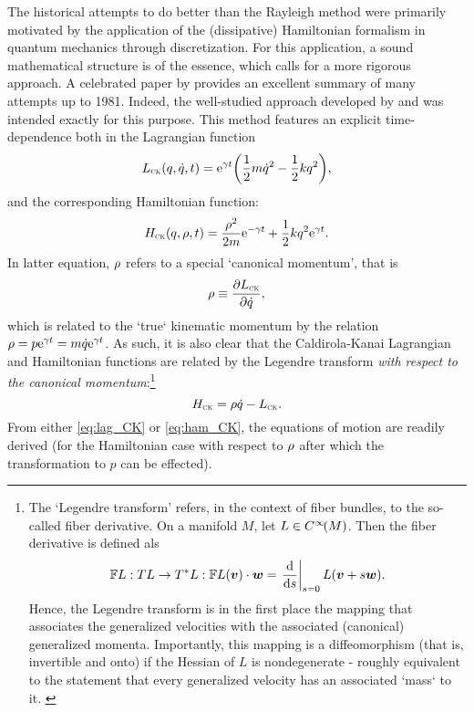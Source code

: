 The historical attempts to do better than the Rayleigh method were primarily motivated by the application of the (dissipative) Hamiltonian formalism in quantum mechanics through discretization. For this application, a sound mathematical structure is of the essence, which calls for a more rigorous approach. A celebrated paper by
\citet{Dekker1981} provides an excellent summary of many attempts up to 1981. Indeed, the well-studied approach developed by \citet{Caldirola1941} and \citet{Kanai1948} was intended exactly for this purpose. This method features an explicit time-dependence both in the Lagrangian function
\begin{equation}
    L_\text{\tiny{\textsc{CK}}}(q, \dot{q}, t) = \mathrm{e}^{\gamma t}\qty(\frac{1}{2}m\dot{q}^2 - \frac{1}{2}kq^2),
    \label{eq:lag_CK}
\end{equation}
and the corresponding Hamiltonian function:
\begin{equation}
    H_\text{\tiny{\textsc{CK}}}(q, \rho, t) = \frac{\rho^2}{2m}\mathrm{e}^{-\gamma t} + \frac{1}{2}kq^2\mathrm{e}^{\gamma t}.
    \label{eq:ham_CK}
\end{equation}
In latter equation, $\rho$ refers to a special `canonical momentum', that is
\begin{equation}
    \rho \equiv \pdv{\ensuremath{L_\text{\tiny{\textsc{CK}}}}}{\dot{q}},
    \label{eq:can_momentum}
\end{equation}
which is related to the `true` kinematic momentum by the relation $\rho = p\mathrm{e}^{\gamma
t} = m\dot{q}\mathrm{e}^{\gamma t}$. As such, it is also clear that the Caldirola-Kanai Lagrangian and Hamiltonian functions are related by the Legendre transform \emph{with respect to the canonical momentum}:\footnote{The `Legendre transform'
refers, in the context of fiber bundles, to the so-called fiber derivative. On a manifold $M$, let $L \in
C^\infty\!\qty(M)$. Then the fiber derivative is defined als 
    $$ \fiberder{L}: \tbundle{L}\to\ctbundle{L}: \fiberder{L}(\vec{v})\cdot\vec{w} = \left. \dv{}{s}\right\vert_{s = 0} L(\vec{v} +
    s\vec{w}). $$
 Hence, the Legendre transform is in the first place the mapping that associates the generalized velocities with the
 associated (canonical) generalized momenta. Importantly, this mapping is a diffeomorphism (that is, invertible and onto) if the Hessian of
 $L$ is nondegenerate - roughly equivalent to the statement that every generalized velocity has an associated `mass` to
 it. \cite{Marsden1998}}
$$ H_\text{\tiny{\textsc{CK}}} = \rho \dot{q} - L_\text{\tiny{\textsc{CK}}}. $$
From either \cref{eq:lag_CK} or \cref{eq:ham_CK}, the equations of motion are readily
derived (for the Hamiltonian case with respect to $\rho$ after which the transformation to $p$ can be effected).
